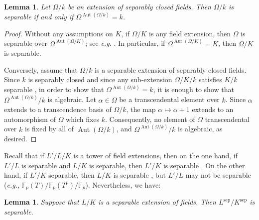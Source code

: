 \documentclass[11pt, reqno]{amsart}
\numberwithin{equation}{section}
\newtheorem{lem}[teo]{Lemma}
\theoremstyle{definition}
\theoremstyle{remark}
\def\sep{{\text{sep}}}
\DeclareMathOperator{\aut}{Aut}
\begin{document}
 \begin{lem}
  \label{L:autLKsepclosed}
  Let $\Omega/k$ be an extension of separably closed fields. Then
  $\Omega/k$ is separable if and only if $\Omega^{\aut(\Omega/k)} = k$.
 \end{lem}

 \begin{proof}
   Without any assumptions on $K$, if $\Omega/K$ is any field extension, then $\Omega$ is separable
  over $\Omega^{\operatorname{Aut}(\Omega/K)}$; see \emph{e.g.} \cite[\S 15.3,
  Prop.~7]{bourbakifields}. In particular, if $\Omega^{\operatorname{Aut}(\Omega/K)} =
  K$, then $\Omega/K$ is separable.

  Conversely, assume that $\Omega/k$ is a separable extension of
  separably closed fields. Since $k$ is separably closed and since any
  sub-extension $\Omega/K/k$ satisfies $K/k$ separable \cite[Prop.~8, p.V.116]{bourbakifields}, in order to show
  that $\Omega^{\operatorname{Aut}(\Omega/k)} =k$, it is enough to show
  that $\Omega^{\operatorname{Aut}(\Omega/k)} /k$ is algebraic. Let
  $\alpha \in \Omega$ be a transcendental element over $k$.  Since
  $\alpha$ extends to a transcendence basis of $\Omega/k$, the map
  $\alpha \mapsto \alpha+1$ extends to an automorphism of $\Omega$ which
  fixes $k$.  Consequently, no element of $\Omega$ transcendental over
  $k$ is fixed by all of $\aut(\Omega/k)$, and
  $\Omega^{\operatorname{Aut}(\Omega/k)} /k$ is algebraic, as desired.
 \end{proof}


 Recall that if $L'/L/K$ is a tower of field extensions, then on the one hand,  
if $L'/L$ is separable and $L/K$ is separable, then $L'/K$ is separable \cite[Prop.~9, p.V.117]{bourbakifields}.   
 On the other hand, if  $L'/K$ separable,
 then $L/K$ is separable \cite[Prop.~8, p.V.116]{bourbakifields}, but $L'/L$
 may not be separable (\emph{e.g.},
 $\mathbb{F}_p(T)/\mathbb{F}_p(T^p)/\mathbb{F}_p$). Nevertheless, we have:


 \begin{lem}\label{L:L/KsepCl}
  Suppose that $L/K$ is a separable extension of fields.  Then $L^{\sep}/K^{\sep}$
  is separable.
 \end{lem}
\end{document}
